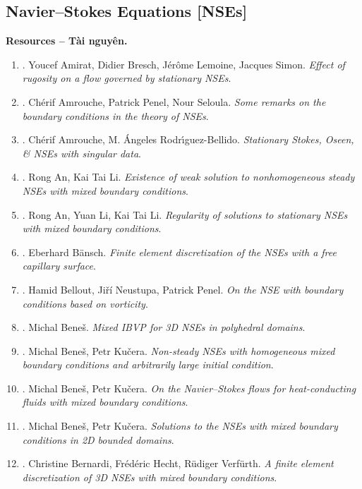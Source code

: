 \documentclass{article}
\begin{document}
\subsection{Navier--Stokes Equations [NSEs]}
\textbf{\textsf{Resources -- Tài nguyên.}}
\begin{enumerate}
	\item \cite{Amirat_Bresch_Lemoine_Simon2001}. {\sc Youcef Amirat, Didier Bresch, J\'{e}r\^{o}me Lemoine, Jacques Simon}. {\it Effect of rugosity on a flow governed by stationary NSEs}.
	\item \cite{Amrouche_Penel_Seloula2013}. {\sc Ch\'{e}rif Amrouche, Patrick Penel, Nour Seloula}. {\it Some remarks on the boundary conditions in the theory of NSEs}.
	\item \cite{Amrouche_Rodriguez-Bellido2011}. {\sc Ch\'{e}rif Amrouche, M. \'{A}ngeles Rodr\'{\i}guez-Bellido}. {\it Stationary Stokes, Oseen, \& NSEs with singular data}.
	\item \cite{An_Li2009}. {\sc Rong An, Kai Tai Li}. {\it Existence of weak solution to nonhomogeneous steady NSEs with mixed boundary conditions}.
	\item \cite{An_Li_Li2009}. {\sc Rong An, Yuan Li, Kai Tai Li}. {\it Regularity of solutions to stationary NSEs with mixed boundary conditions}.
	\item \cite{Bansch2001}. {\sc Eberhard B\"{a}nsch}. {\it Finite element discretization of the NSEs with a free capillary surface}.
	\item \cite{Bellout_Neustupa_Penel2004}. {\sc Hamid Bellout, Ji\v{r}\'i Neustupa, Patrick Penel}. {\it On the NSE with boundary conditions based on vorticity}.
	\item \cite{Benes2011}. {\sc Michal Bene\v{s}}. {\it Mixed IBVP for 3D NSEs in polyhedral domains}.
	\item \cite{Benes_Kucera2007}. {\sc Michal Bene\v{s}, Petr Ku\v{c}era}. {\it Non-steady NSEs with homogeneous mixed boundary conditions and arbitrarily large initial condition}.
	\item \cite{Benes_Kucera2012}. {\sc Michal Bene\v{s}, Petr Ku\v{c}era}. {\it On the Navier--Stokes flows for heat-conducting fluids with mixed boundary conditions}.
	\item \cite{Benes_Kucera2016}. {\sc Michal Bene\v{s}, Petr Ku\v{c}era}. {\it Solutions to the NSEs with mixed boundary conditions in 2D bounded domains}.	
	\item \cite{Bernardi_Hecht_Verfurth2009}. {\sc Christine Bernardi, Fr\'{e}d\'{e}ric Hecht, R\"{u}diger Verf\"{u}rth}. {\it A finite element discretization of 3D NSEs with mixed boundary conditions}.

\end{enumerate}
\end{document}
